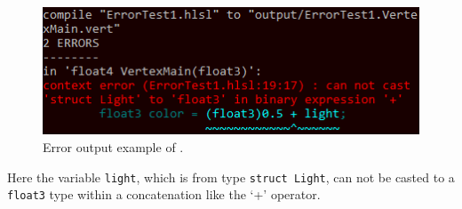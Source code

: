 \documentclass{article}
\begin{document}
\begin{figure}[H]
	\centering
	\includegraphics{images/error_output2}
	\caption{Error output example of \XSC.}
	\label{fig:error_output2}
\end{figure}
Here the variable \texttt{light}, which is from type \texttt{struct Light}, can not be casted
to a \texttt{float3} type within a concatenation like the `+' operator.











\end{document}
